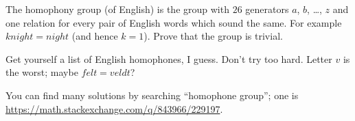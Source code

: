 \begin{problem}
	\onechili
    The homophony group (of English) is the group
	with $26$ generators $a$, $b$, \dots, $z$
	and one relation for every pair of English words
	which sound the same.
	For example $knight = night$ (and hence $k=1$).
	Prove that the group is trivial.
	\begin{hint}
		Get yourself a list of English homophones, I guess.
		Don't try too hard.
		Letter $v$ is the worst; maybe $felt = veldt$?
	\end{hint}
	\begin{sol}
		You can find many solutions by searching ``homophone group'';
		one is \url{https://math.stackexchange.com/q/843966/229197}.
	\end{sol}
\end{problem}

%
%
%
